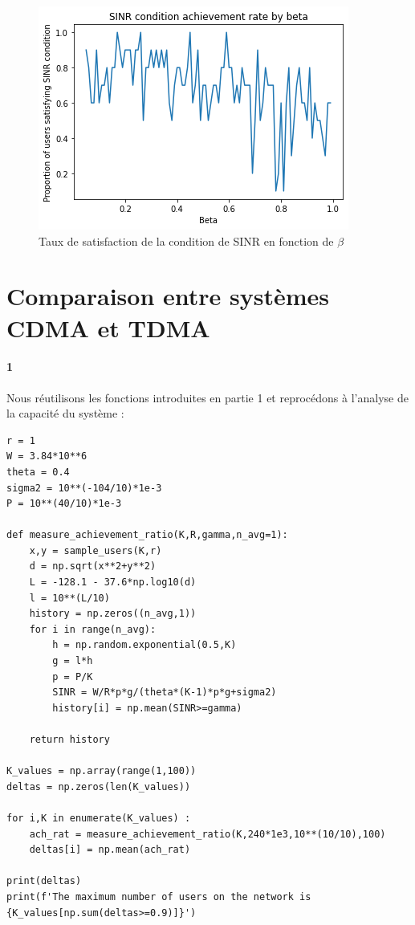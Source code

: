 \documentclass[a4paper,11pt,2]{article}
\begin{document}
\begin{figure}[h]
\centering
\includegraphics[width=0.7\linewidth]{./Images/II-2aii.png}
\caption{Taux de satisfaction de la condition de SINR en fonction de $\beta$}
\label{fig:II2a}
\end{figure}

\section{Comparaison entre systèmes CDMA et TDMA}
\paragraph{1} Nous réutilisons les fonctions introduites en partie 1 et reprocédons à l'analyse de la capacité du système :
\begin{center}
\begin{lstlisting}
r = 1
W = 3.84*10**6
theta = 0.4
sigma2 = 10**(-104/10)*1e-3
P = 10**(40/10)*1e-3

def measure_achievement_ratio(K,R,gamma,n_avg=1):
    x,y = sample_users(K,r)
    d = np.sqrt(x**2+y**2)
    L = -128.1 - 37.6*np.log10(d)
    l = 10**(L/10)
    history = np.zeros((n_avg,1))
    for i in range(n_avg):
        h = np.random.exponential(0.5,K)
        g = l*h
        p = P/K
        SINR = W/R*p*g/(theta*(K-1)*p*g+sigma2)
        history[i] = np.mean(SINR>=gamma)

    return history

K_values = np.array(range(1,100))
deltas = np.zeros(len(K_values))

for i,K in enumerate(K_values) :
    ach_rat = measure_achievement_ratio(K,240*1e3,10**(10/10),100)
    deltas[i] = np.mean(ach_rat)

print(deltas)
print(f'The maximum number of users on the network is {K_values[np.sum(deltas>=0.9)]}')
\end{lstlisting}
\end{center}
\end{document}
